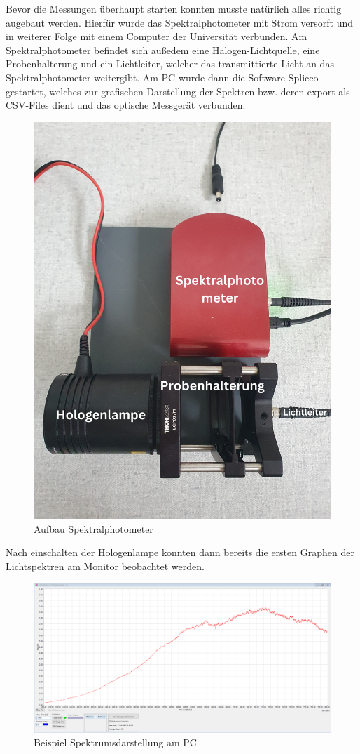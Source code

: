 \documentclass[12pt,a4paper,twoside]{article}
\begin{document}
Bevor die Messungen überhaupt starten konnten musste natürlich alles richtig augebaut werden. Hierfür wurde das Spektralphotometer mit Strom versorft und in weiterer Folge mit einem Computer der Universität verbunden.
Am Spektralphotometer befindet sich außedem eine Halogen-Lichtquelle, eine Probenhalterung und ein Lichtleiter, welcher das transmittierte Licht an das Spektralphotometer weitergibt.
Am PC wurde dann die Software Splicco gestartet, welches zur grafischen Darstellung der Spektren bzw. deren export als CSV-Files dient und das optische Messgerät verbunden. 

\begin{figure}[H]
    \centering
    \includegraphics[width=0.6\linewidth]{nudes/Spektralphotometer.jpg}
    \caption{Aufbau Spektralphotometer}
    \label{fig:VersuchsaufbauIRL}
\end{figure}

\noindent
Nach einschalten der Hologenlampe konnten dann bereits die ersten Graphen der Lichtspektren am Monitor beobachtet werden. 

\begin{figure}[H]
    \centering
    \includegraphics[width=0.6\linewidth]{nudes/Verlauf-Referenzspektrum.PNG}
    \caption{Beispiel Spektrumsdarstellung am PC}
    \label{fig:SpliccoSoftware}
\end{figure}
\end{document}
